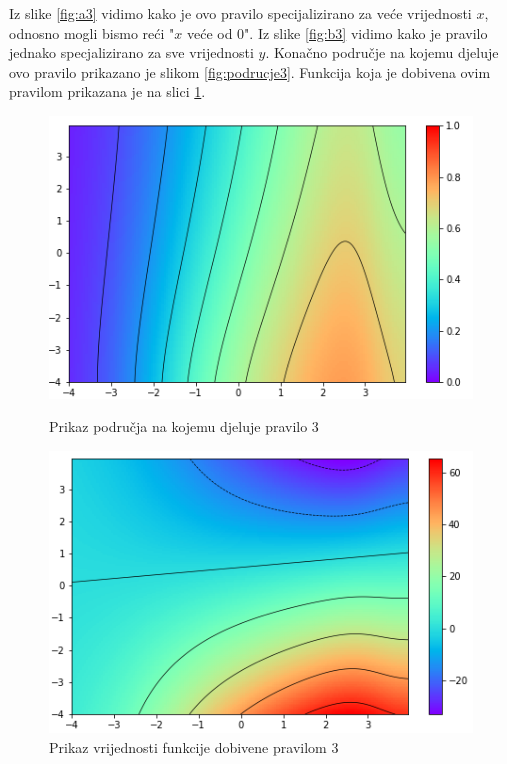 \documentclass[12pt, a4paper, numeric]{article}
\begin{document}
Iz slike \ref{fig:a3} vidimo kako je ovo pravilo specijalizirano za veće vrijednosti $x$, odnosno mogli bismo reći "$x$ veće od $0$".
Iz slike \ref{fig:b3} vidimo kako je pravilo jednako specjalizirano za sve vrijednosti $y$.
Konačno područje na kojemu djeluje ovo pravilo prikazano je slikom \ref{fig:podrucje3}.
Funkcija koja je dobivena ovim pravilom prikazana je na slici \ref{fig:rule3}.
\begin{figure}[!ht]
    \centering
    \begin{minipage}{.5\textwidth}
        \centering
        \includegraphics[width=.9\linewidth]{img/ruleArea3}
        \captionsetup{justification=centering}
        \caption{Prikaz područja na kojemu djeluje pravilo 3}
        \label{fig:podrucje3}
    \end{minipage}%
    \begin{minipage}{.5\textwidth}
        \centering
        \includegraphics[width=.9\linewidth]{img/rule3}
        \captionsetup{justification=centering}
        \caption{Prikaz vrijednosti funkcije dobivene pravilom 3}
        \label{fig:rule3}
    \end{minipage}
\end{figure}
\end{document}
